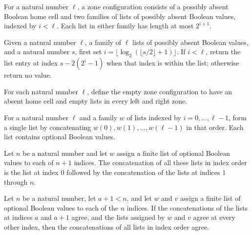 \begin{definition}
\label{Turing.ZoneContents}
\leanok
{}
For a natural number $\ell$, a zone configuration consists of a possibly absent Boolean
home cell and two families of lists of possibly absent Boolean values, indexed by
$i<\ell$. Each list in either family has length at most $2^{i+1}$.
\end{definition}

\begin{definition}
\label{Turing.zoneSlot}
\leanok
{}
Given a natural number $\ell$, a family of $\ell$ lists of possibly absent Boolean
values, and a natural number $s$, first set $i=\lfloor\log_2(\lfloor
s/2\rfloor+1)\rfloor$. If $i<\ell$, return the list entry at index $s-2(2^i-1)$ when
that index is within the list; otherwise return no value.
\end{definition}

\begin{definition}
\label{Turing.ZoneContents.empty}
\leanok
{}
For each natural number $\ell$, define the empty zone configuration to have an absent
home cell and empty lists in every left and right zone.
\end{definition}

\begin{definition}
\label{Turing.zoneSide}
\leanok
For a natural number $\ell$ and a family $w$ of lists indexed by $i=0,\ldots,\ell-1$,
form a single list by concatenating $w(0),w(1),\ldots,w(\ell-1)$ in that order. Each
list contains optional Boolean values.
\end{definition}

\begin{theorem}
\label{Turing.zoneSide_succ}
\leanok
{}
Let $n$ be a natural number and let $w$ assign a finite list of optional Boolean values
to each of $n+1$ indices. The concatenation of all these lists in index order is the
list at index $0$ followed by the concatenation of the lists at indices $1$ through $n$.
\end{theorem}

\begin{theorem}
\label{Turing.zoneSide_adjacent}
\leanok
{}
Let $n$ be a natural number, let $a+1<n$, and let $w$ and $v$ assign a finite list of
optional Boolean values to each of the $n$ indices. If the concatenations of the lists
at indices $a$ and $a+1$ agree, and the lists assigned by $w$ and $v$ agree at every
other index, then the concatenations of all lists in index order agree.
\end{theorem}

